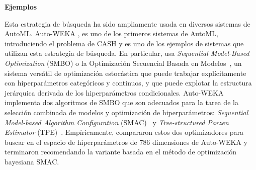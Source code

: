 %
%
%
%
\quad

\textbf{Ejemplos}

\quad

Esta estrategia de búsqueda ha sido ampliamente usada en diversos sistemas de AutoML. Auto-WEKA \cite{thornton2013auto}, es uno de los primeros sistemas de AutoML, introduciendo el problema de CASH y es uno de los ejemplos de sistemas que utilizan esta estrategia de búsqueda. En particular, usa \textit{Sequential Model-Based Optimization} (SMBO) o la Optimización Secuencial Basada en Modelos~\cite{hutter2011sequential}, un sistema versátil de optimización estocástica que puede trabajar explícitamente con hiperparámetros categóricos y continuos, y que puede explotar la estructura jerárquica derivada de los hiperparámetros condicionales. Auto-WEKA implementa dos algoritmos de SMBO que son adecuados para la tarea de la selección combinada de modelos y optimización de hiperparámetros: \textit{Sequential Model-based Algorithm Configuration} (SMAC)~\cite{hutter2011sequential} y \textit{Tree-structured Parzen Estimator} (TPE)~\cite{bergstra2011algorithms}. Empíricamente, compararon estos dos optimizadores para buscar en el espacio de hiperparámetros de 786 dimensiones de Auto-WEKA y terminaron recomendando la variante basada en el método de optimización bayesiana SMAC.

